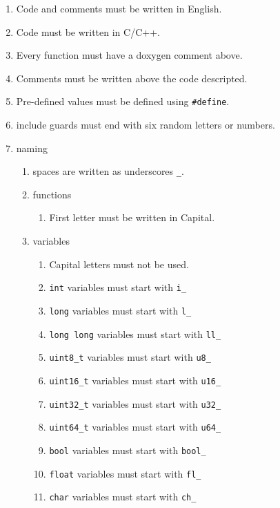 \begin{enumerate}
    \item Code and comments must be written in English.
    \item Code must be written in C/C++.
    \item Every function must have a doxygen comment above.
    \item Comments must be written above the code descripted.
    \item Pre-defined values must be defined using \lstinline{#define}.
    \item include guards must end with six random letters or numbers.
    \item naming
    \begin{enumerate}[label=\arabic*.]
        \item spaces are written as underscores \lstinline{_}.
        \item functions
        \begin{enumerate}[label=\arabic*.]
            \item First letter must be written in Capital.
        \end{enumerate}
        \item variables
        \begin{enumerate}[label=\arabic*.]
            \item Capital letters must not be used.
            \item \lstinline{int} variables must start with \lstinline{i_}
            \item \lstinline{long} variables must start with \lstinline{l_}
            \item \lstinline{long long} variables must start with \lstinline{ll_}
            \item \lstinline{uint8_t} variables must start with \lstinline{u8_}
            \item \lstinline{uint16_t} variables must start with \lstinline{u16_}
            \item \lstinline{uint32_t} variables must start with \lstinline{u32_}
            \item \lstinline{uint64_t} variables must start with \lstinline{u64_}
            \item \lstinline{bool} variables must start with \lstinline{bool_}
            \item \lstinline{float} variables must start with \lstinline{fl_}
            \item \lstinline{char} variables must start with \lstinline{ch_}

\end{enumerate}
\end{enumerate}
\end{enumerate}
